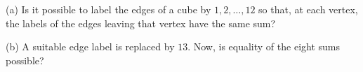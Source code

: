 (a) Is it possible to label the edges of a cube by $1, 2, \ldots, 12$ so that, at each vertex, the labels of the edges leaving that vertex have the same sum?

(b) A suitable edge label is replaced by $13$. Now, is equality of the eight sums possible?
